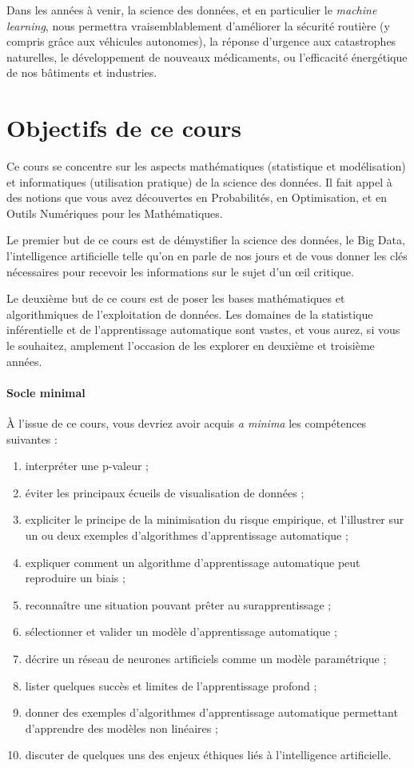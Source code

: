 Dans les années à venir, la science des données, et en particulier le
\textit{machine learning}, nous permettra vraisemblablement d'améliorer la
sécurité routière (y compris grâce aux véhicules autonomes), la réponse
d'urgence aux catastrophes naturelles, le développement de nouveaux
médicaments, ou l'efficacité énergétique de nos bâtiments et industries.



\section{Objectifs de ce cours}
Ce cours se concentre sur les aspects mathématiques (statistique et
modélisation) et informatiques (utilisation pratique) de la science des
données. Il fait appel à des notions que vous avez découvertes en Probabilités,
en Optimisation, et en Outils Numériques pour les Mathématiques.

Le premier but de ce cours est de démystifier la science des données, le Big
Data, l'intelligence artificielle telle qu'on en parle de nos jours et de vous
donner les clés nécessaires pour recevoir les informations sur le sujet d'un
\oe{}il critique.

Le deuxième but de ce cours est de poser les bases mathématiques et
algorithmiques de l'exploitation de données. Les domaines de la statistique
inférentielle et de l'apprentissage automatique sont vastes, et vous aurez, si
vous le souhaitez, amplement l'occasion de les explorer en deuxième et troisième
années.

\paragraph{Socle minimal} 
À l'issue de ce cours, vous devriez avoir acquis
\textit{a minima} les compétences suivantes :
\begin{enumerate}
	\item interpréter une p-valeur ;
	\item éviter les principaux écueils de visualisation de données ;
	\item expliciter le principe de la minimisation du risque empirique, et
	l'illustrer sur un ou deux ex\-emples d'algorithmes d'apprentissage automatique ;
	\item expliquer comment un algorithme d'apprentissage automatique peut
	reproduire un biais  ;
	\item reconnaître une situation pouvant prêter au surapprentissage ;
	\item sélectionner et valider un modèle d'apprentissage automatique ;
	\item décrire un réseau de neurones artificiels comme un modèle paramétrique ;
	\item lister quelques succès et limites de l'apprentissage profond ;
	\item donner des exemples d'algorithmes d'apprentissage automatique permettant
	d'apprendre des modèles non linéaires ;
	\item discuter de quelques uns des enjeux éthiques liés à l'intelligence
	artificielle.
\end{enumerate}

